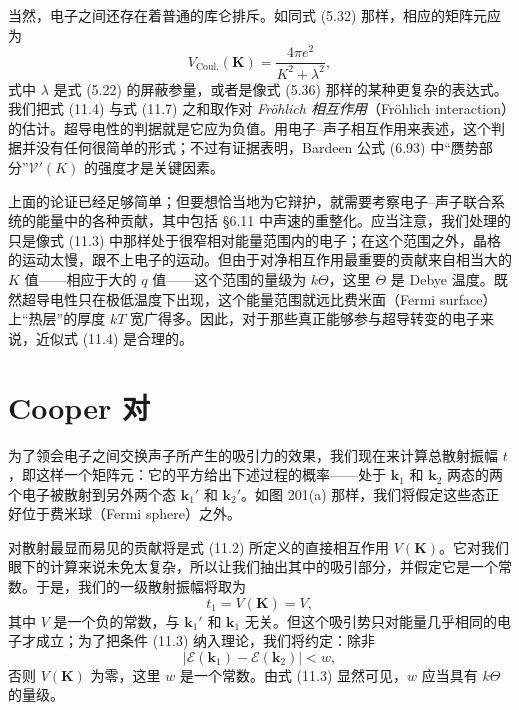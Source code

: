 当然，电子之间还存在着普通的库仑排斥。如同式 (5.32) 那样，相应的矩阵元应为
\begin{equation*}
V_{\mathrm{Coul.}}(\mathbf{K})=\frac{4\pi e^{2}}{K^{2}+\lambda^{2}},
\tag{11.7}
\end{equation*}
式中 $\lambda$ 是式 (5.22) 的屏蔽参量，或者是像式 (5.36) 那样的某种更复杂的表达式。我们把式 (11.4) 与式 (11.7) 之和取作对 \emph{Fröhlich 相互作用}（Fröhlich interaction）的估计。超导电性的判据就是它应为负值。用电子–声子相互作用来表述，这个判据并没有任何很简单的形式；不过有证据表明，Bardeen 公式 (6.93) 中“赝势部分”$\mathcal{V}'(K)$ 的强度才是关键因素。

上面的论证已经足够简单；但要想恰当地为它辩护，就需要考察电子–声子联合系统的能量中的各种贡献，其中包括 §6.11 中声速的重整化。应当注意，我们处理的只是像式 (11.3) 中那样处于很窄相对能量范围内的电子；在这个范围之外，晶格的运动太慢，跟不上电子的运动。但由于对净相互作用最重要的贡献来自相当大的 $K$ 值——相应于大的 $q$ 值——这个范围的量级为 $k\Theta$，这里 $\Theta$ 是 Debye 温度。既然超导电性只在极低温度下出现，这个能量范围就远比费米面（Fermi surface）上“热层”的厚度 $kT$ 宽广得多。因此，对于那些真正能够参与超导转变的电子来说，近似式 (11.4) 是合理的。

\section{Cooper 对}

为了领会电子之间交换声子所产生的吸引力的效果，我们现在来计算总散射振幅 $t$，即这样一个矩阵元：它的平方给出下述过程的概率——处于 $\mathbf{k}_1$ 和 $\mathbf{k}_2$ 两态的两个电子被散射到另外两个态 $\mathbf{k}_1'$ 和 $\mathbf{k}_2'$。如图 201(a) 那样，我们将假定这些态正好位于费米球（Fermi sphere）之外。

对散射最显而易见的贡献将是式 (11.2) 所定义的直接相互作用 $V(\mathbf{K})$。它对我们眼下的计算来说未免太复杂，所以让我们抽出其中的吸引部分，并假定它是一个常数。于是，我们的一级散射振幅将取为
\begin{equation*}
t_{1}=V(\mathbf{K})=V,
\tag{11.8}
\end{equation*}
其中 $V$ 是一个负的常数，与 $\mathbf{k}_1'$ 和 $\mathbf{k}_1$ 无关。但这个吸引势只对能量几乎相同的电子才成立；为了把条件 (11.3) 纳入理论，我们将约定：除非
\begin{equation*}
|\mathcal{E}(\mathbf{k}_{1})-\mathcal{E}(\mathbf{k}_{2})|<w,
\tag{11.9}
\end{equation*}
否则 $V(\mathbf{K})$ 为零，这里 $w$ 是一个常数。由式 (11.3) 显然可见，$w$ 应当具有 $k\Theta$ 的量级。

